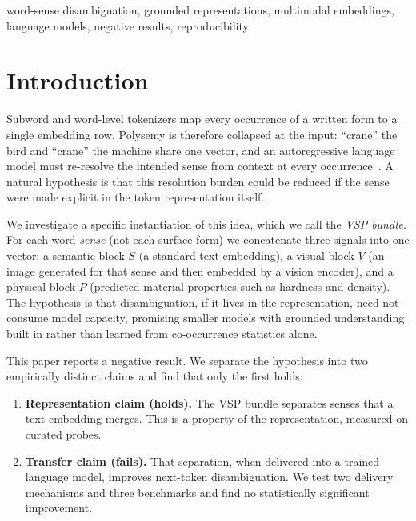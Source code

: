 \documentclass[twoside,11pt]{article}
\begin{document}
\begin{abstract}
hyperparameter selection, and argue that the transferable contribution is methodological: seed reproduction and held-out hyperparameter selection converted a string of apparent wins into a single, bounded negative.
\end{abstract}

\begin{keywords}
  word-sense disambiguation, grounded representations, multimodal embeddings, language models, negative results, reproducibility
\end{keywords}

\section{Introduction}

Subword and word-level tokenizers map every occurrence of a written form to a single embedding row. Polysemy is therefore collapsed at the input: ``crane'' the bird and ``crane'' the machine share one vector, and an autoregressive language model must re-resolve the intended sense from context at every occurrence~\citep{vaswani2017}. A natural hypothesis is that this resolution burden could be reduced if the sense were made explicit in the token representation itself.

We investigate a specific instantiation of this idea, which we call the \emph{VSP bundle}. For each word \emph{sense} (not each surface form) we concatenate three signals into one vector: a semantic block $S$ (a standard text embedding), a visual block $V$ (an image generated for that sense and then embedded by a vision encoder), and a physical block $P$ (predicted material properties such as hardness and density). The hypothesis is that disambiguation, if it lives in the representation, need not consume model capacity, promising smaller models with grounded understanding built in rather than learned from co-occurrence statistics alone.

This paper reports a negative result. We separate the hypothesis into two empirically distinct claims and find that only the first holds:

\begin{enumerate}
\item \textbf{Representation claim (holds).} The VSP bundle separates senses that a text embedding merges. This is a property of the representation, measured on curated probes.
\item \textbf{Transfer claim (fails).} That separation, when delivered into a trained language model, improves next-token disambiguation. We test two delivery mechanisms and three benchmarks and find no statistically significant improvement.
\end{enumerate}
\end{document}
